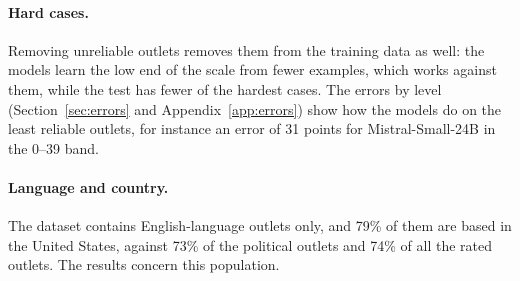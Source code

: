 \documentclass[11pt,a4paper]{article}
\begin{document}
\paragraph{Hard cases.} Removing unreliable outlets removes them from the training data as well: the models learn the low
end of the scale from fewer examples, which works against them, while the test has fewer of the hardest cases. The
errors by level (Section~\ref{sec:errors} and Appendix~\ref{app:errors}) show how the models do on the least reliable
outlets, for instance an error of 31 points for Mistral-Small-24B in the 0--39 band.

\paragraph{Language and country.} The dataset contains English-language outlets only, and 79\% of them are based in the
United States, against 73\% of the political outlets and 74\% of all the rated outlets. The results concern this
population.

\begin{table}[h]
\centering
\caption{The dataset and NewsGuard. Each row is a set of outlets; the columns give their number, their mean and median
NewsGuard score, their shares (\%) by level and the share based in the United States.}\label{tab:population}
\end{table}
\end{document}
